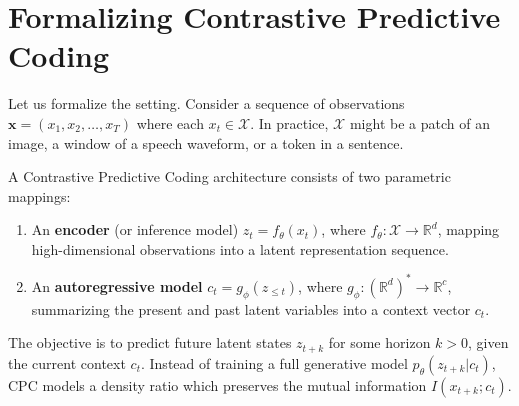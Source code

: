 \section{Formalizing Contrastive Predictive Coding}

Let us formalize the setting. Consider a sequence of observations $\mathbf{x} = (x_1, x_2, \dots, x_T)$ where each $x_t \in \mathcal{X}$. In practice, $\mathcal{X}$ might be a patch of an image, a window of a speech waveform, or a token in a sentence.

\begin{definition}
A Contrastive Predictive Coding architecture consists of two parametric mappings:
\begin{enumerate}
    \item An \textbf{encoder} (or inference model) $z_t = f_\theta(x_t)$, where $f_\theta : \mathcal{X} \to \mathbb{R}^d$, mapping high-dimensional observations into a latent representation sequence.
    \item An \textbf{autoregressive model} $c_t = g_\phi(z_{\le t})$, where $g_\phi : (\mathbb{R}^d)^* \to \mathbb{R}^c$, summarizing the present and past latent variables into a context vector $c_t$.
\end{enumerate}
\end{definition}

The objective is to predict future latent states $z_{t+k}$ for some horizon $k>0$, given the current context $c_t$. Instead of training a full generative model $p_\theta(z_{t+k} | c_t)$, CPC models a density ratio which preserves the mutual information $I(x_{t+k}; c_t)$.

